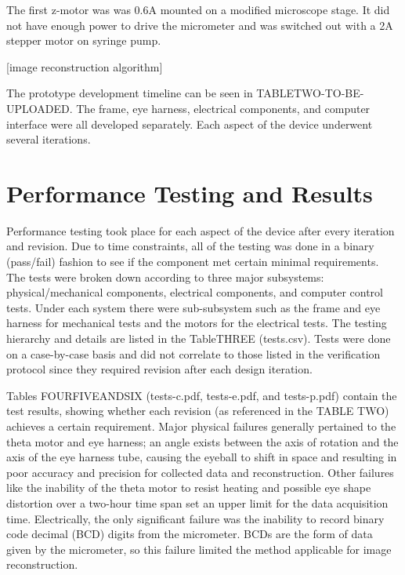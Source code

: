 \documentclass{article}
\begin{document}
The first z-motor was was 0.6A mounted on a modified microscope stage. It did not have enough power to drive the micrometer and was switched out with a 2A stepper motor on syringe pump.


 [image reconstruction algorithm]




The prototype development timeline can be seen in TABLETWO-TO-BE-UPLOADED. The frame, eye harness, electrical components, and computer interface were all developed separately. Each aspect of the device underwent several iterations.



\section{Performance Testing and Results}
\label{sec:perf-test-results}

Performance testing took place for each aspect of the device after every iteration and revision. Due to time constraints, all of the testing was done in a binary (pass/fail) fashion to see if the component met certain minimal requirements. The tests were broken down according to three major subsystems: physical/mechanical components, 
electrical components, and computer control tests. Under each system there were sub-subsystem such as the frame and eye harness for mechanical tests and the motors for the electrical tests. The testing hierarchy and details are listed in the TableTHREE (tests.csv). Tests were done on a case-by-case basis and did not correlate to those listed in the verification protocol since they required revision after each design iteration. 
	
Tables FOURFIVEANDSIX (tests-c.pdf, tests-e.pdf, and tests-p.pdf) contain the test results, showing whether each revision (as referenced in the TABLE TWO) achieves a certain requirement. Major physical failures generally pertained to the theta motor and eye harness; an angle exists between the axis of rotation and the axis of the eye harness tube, causing the eyeball to shift in space and resulting in poor accuracy and precision for collected data and reconstruction. Other failures like the inability of the theta motor to resist heating and possible eye shape distortion over a two-hour time span set an upper limit for the data acquisition time. Electrically, the only significant failure was the inability to record binary code decimal (BCD) digits from the micrometer. BCDs are the form of data given by the micrometer, so this failure limited the method applicable for image reconstruction. 
\end{document}
